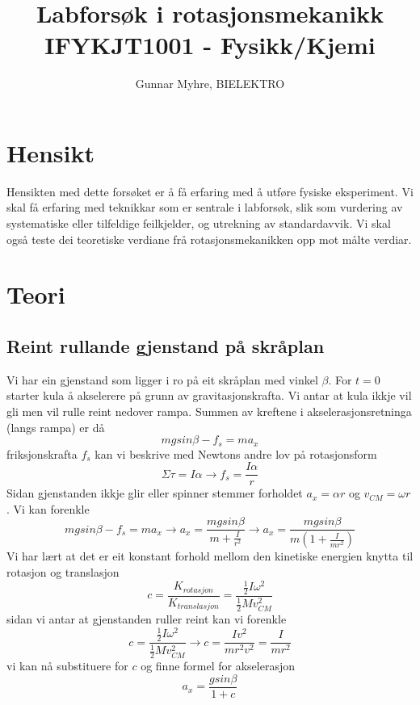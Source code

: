 \documentclass[12pt,a4paper]{article}
\title{%
  Labforsøk i rotasjonsmekanikk \\
  \large IFYKJT1001 - Fysikk/Kjemi \\
  }
\author{Gunnar Myhre, BIELEKTRO}
\begin{document}
  \maketitle
  \tableofcontents

  \section{Hensikt}
  Hensikten med dette forsøket er å få erfaring med å utføre fysiske
  eksperiment.  Vi skal få erfaring med teknikkar som er sentrale i labforsøk,
  slik som vurdering av systematiske eller tilfeldige feilkjelder, og utrekning
  av standardavvik. Vi skal også teste dei teoretiske verdiane frå
  rotasjonsmekanikken opp mot målte verdiar.

  \section{Teori}
  \subsection{Reint rullande gjenstand på skråplan}
  Vi har ein gjenstand som ligger i ro på eit skråplan med vinkel $\beta$. For $t=0$ starter
  kula å akselerere på grunn av gravitasjonskrafta. Vi antar at kula ikkje vil gli men vil
  rulle reint nedover rampa. Summen av kreftene i akselerasjonsretninga (langs rampa) er då
  \begin{equation}
    mgsin\beta - f_s = ma_x
  \end{equation}
  friksjonskrafta $f_s$ kan vi beskrive med Newtons andre lov på rotasjonsform
  \begin{equation}
    \Sigma \tau = I\alpha \rightarrow f_s = \frac{I\alpha}{r}
  \end{equation}
  Sidan gjenstanden ikkje glir eller spinner stemmer forholdet $a_x = \alpha r$ og
  $v_{CM} = \omega r$. Vi kan forenkle
  \begin{equation}
    mgsin\beta - f_s = ma_x \rightarrow a_x = \frac{mgsin\beta}{m + \frac{I}{r^2}}
    \rightarrow a_x = \frac{mgsin\beta}{m\left( 1 + \frac{I}{mr^2} \right)}
  \end{equation}
  Vi har lært at det er eit konstant forhold mellom den kinetiske energien knytta til
  rotasjon og translasjon
  \begin{equation}
    c = \frac{K_{rotasjon}}{K_{translasjon}} = \frac{\frac{1}{2}I\omega^2}{\frac{1}{2}Mv^2_{CM}}
  \end{equation}
  sidan vi antar at gjenstanden ruller reint kan vi forenkle
  \begin{equation}
    c = \frac{\frac{1}{2}I\omega^2}{\frac{1}{2}Mv^2_{CM}} \rightarrow
    c = \frac{Iv^2}{mr^2v^2} = \frac{I}{mr^2}
  \end{equation}
  vi kan nå substituere for $c$ og finne formel for akselerasjon
  \begin{equation}
    a_x = \frac{gsin\beta}{1+c}
  \end{equation}
\end{document}
